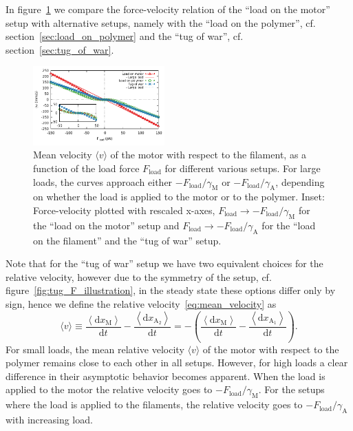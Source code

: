 \documentclass[aps,pre,twocolumn,showpacs,showkeys,superscriptaddress,floatfix]{revtex4-1}
\newcommand{\rmd}{{\mathrm d}}
\begin{document}
In figure~\ref{fig:F_v_setups} we compare the force-velocity relation of the ``load on the motor'' setup with alternative setups,
namely with the ``load on the polymer'', cf. section~\ref{sec:load_on_polymer} and the ``tug of war'', cf. section~\ref{sec:tug_of_war}.
\begin{figure}[t]
\centering
\includegraphics[width=0.45\textwidth,height=!]{F_v_setups}
\caption{
\label{fig:F_v_setups} 
Mean velocity $\langle v \rangle$ of the motor with respect to the filament, as a function of the load force $F_\text{load}$ for different various setups.
For large loads, the curves approach either  $ - F_\text{load} / \gamma_\text{M}$ or $ - F_\text{load} / \gamma_\text{A}$, depending on whether the load is applied to the motor or to the polymer. 
Inset: Force-velocity plotted with rescaled x-axes,
$F_\text{load} \to - F_\text{load} / \gamma_\text{M}$ for the ``load on the motor'' setup 
and $F_\text{load} \to - F_\text{load} / \gamma_\text{A}$ for the ``load on the filament'' and the ``tug of war'' setup. 
}
\end{figure}
Note that for the ``tug of war'' setup we have two equivalent choices for the relative velocity,
however due to the symmetry of the setup, cf. figure~\ref{fig:tug_F_illustration}, in the steady state these options differ only by sign, 
hence we define the relative velocity~\eqref{eq:mean_velocity} as 
\[
\langle v \rangle 
\equiv \frac{ \left\langle \rmd x_\text{M} \right\rangle }{ \rmd t }
- \frac{ \left\langle \rmd x_{\text{A}_2} \right\rangle }{ \rmd t }
= - \left( \frac{ \left\langle \rmd x_\text{M} \right\rangle }{ \rmd t }
- \frac{ \left\langle \rmd x_{\text{A}_1} \right\rangle }{ \rmd t } \right) .
\]
For small loads, the mean relative velocity $\langle v \rangle$ of the motor with respect to the polymer remains close to each other in all setups.
However, for high loads a clear difference in their asymptotic behavior becomes apparent.
When the load is applied to the motor the relative velocity goes to $ - F_\text{load} / \gamma_\text{M}$.
For the setups where the load is applied to the filaments, the relative velocity goes to $ - F_\text{load} / \gamma_\text{A}$ with increasing load.
\end{document}
